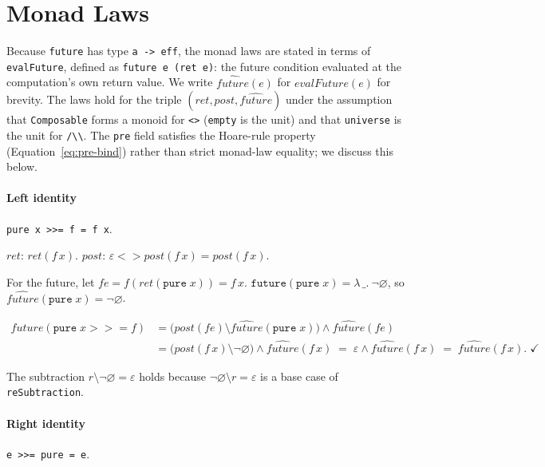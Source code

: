 \documentclass[acmsmall,screen]{acmart}
\newcommand{\post}{\mathit{post}}
\newcommand{\fut}{\mathit{future}}
\newcommand{\ret}{\mathit{ret}}
\newcommand{\univ}{\neg\varnothing}
\begin{document}
\section{Monad Laws}
\label{sec:monad-laws}

Because \lstinline{future} has type \lstinline{a -> eff}, the monad laws
are stated in terms of \lstinline{evalFuture}, defined as
\lstinline{future e (ret e)}: the future condition evaluated at the
computation's own return value.
We write $\widehat{\fut}(e)$ for $\mathit{evalFuture}(e)$ for brevity.
The laws hold for the triple $(\ret, \post, \widehat{\fut})$ under the
assumption that \lstinline{Composable} forms a monoid for
\lstinline{<>} (\lstinline{empty} is the unit) and that
\lstinline{universe} is the unit for \lstinline{/\\}.
The \lstinline{pre} field satisfies the Hoare-rule property
(Equation~\ref{eq:pre-bind}) rather than strict monad-law equality;
we discuss this below.

\paragraph{Left identity} \lstinline{pure x >>= f = f x}.

$\ret$: $\ret(f\,x)$. \checkmark \quad
$\post$: $\varepsilon \mathbin{<>} \post(f\,x) = \post(f\,x)$. \checkmark

For the future, let $fe = f(\ret(\mathtt{pure}\;x)) = f\,x$.
$\mathtt{future}(\mathtt{pure}\;x) = \lambda\,\_.\ \univ$, so
$\widehat{\fut}(\mathtt{pure}\;x) = \univ$.

\begin{align*}
  \widehat{\fut}(\mathtt{pure}\;x \mathbin{>\!\!>\!\!=} f)
    &= \bigl(\post(fe) \setminus \widehat{\fut}(\mathtt{pure}\;x)\bigr)
       \wedge \widehat{\fut}(fe) \\
    &= \bigl(\post(f\,x) \setminus \univ\bigr)
       \wedge \widehat{\fut}(f\,x)
     \;=\; \varepsilon \wedge \widehat{\fut}(f\,x)
     \;=\; \widehat{\fut}(f\,x). \;\checkmark
\end{align*}

The subtraction $r \setminus \univ = \varepsilon$ holds because
$\univ \setminus r = \varepsilon$ is a base case of
\lstinline{reSubtraction}.

\paragraph{Right identity} \lstinline{e >>= pure = e}.
\end{document}
